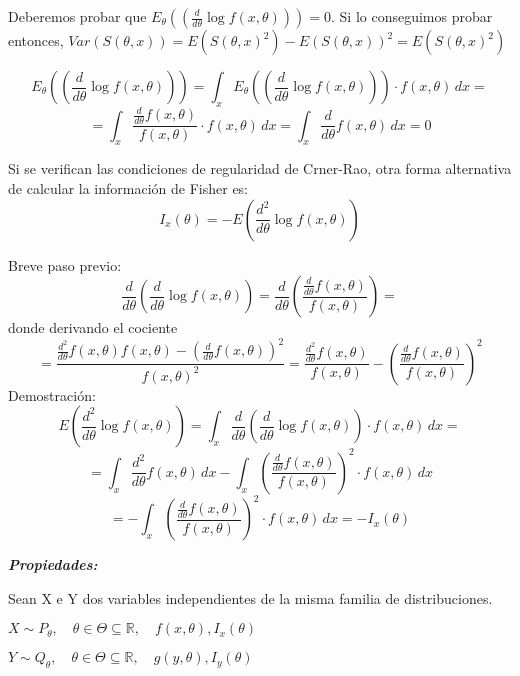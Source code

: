 \newpage

\begin{proofs}
    Deberemos probar que $E_\theta(\left(\frac{d}{d \theta} \log f(x,\theta)\right))=0$.
    Si lo conseguimos probar entonces, $Var(S(\theta,x))=E(S(\theta,x)^2)
    -E(S(\theta,x))^2=E(S(\theta,x)^2)$

    \[
        E_\theta\left(\left(\frac{d}{d \theta} \log f(x,\theta)\right)\right)=
        \int_{x} E_\theta\left(\left(\frac{d}{d \theta} \log f(x,\theta)\right)\right) \cdot f(x,\theta) \,dx =
    \]
    \[
        =\int_{x} \frac{\frac{d}{d \theta} f(x,\theta)}{f(x,\theta)} \cdot f(x,\theta) \,dx 
        =\int_{x} \frac{d}{d \theta} f(x,\theta) \,dx = 0
    \]
\end{proofs}


Si se verifican las condiciones de regularidad de Crner-Rao, otra forma alternativa de calcular
la información de Fisher es:
\[
    I_x(\theta)=-E\left(\frac{d^2}{d \theta} \log f(x,\theta)\right)
\]

\begin{proofs}
    Breve paso previo:
    \[
        \frac{d}{d \theta}\left(\frac{d}{d \theta} \log f(x,\theta)\right)=\frac{d}{d \theta}\left(\frac{\frac{d}{d \theta} f(x,\theta)}{f(x,\theta)}\right)=
    \]
    donde derivando el cociente
    \[
        =\frac{\frac{d^2}{d \theta} f(x,\theta) f(x,\theta) -\left(\frac{d}{d \theta} f(x,\theta)\right)^2}{f(x,\theta)^2}=\frac{\frac{d^2}{d \theta} f(x,\theta)}{f(x,\theta)} -\left(\frac{\frac{d}{d \theta} f(x,\theta)}{f(x,\theta)}\right)^2
    \]
    Demostración:
    \[
        E(\frac{d^2}{d \theta} \log f(x,\theta))=
        \int_{x} \frac{d}{d \theta}\left(\frac{d}{d \theta} \log f(x,\theta)\right) \cdot f(x,\theta) \,dx =
    \]
    \[
        =\int_{x} \frac{d^2}{d \theta} f(x, \theta) \,dx - \int_{x}\left(\frac{\frac{d}{d \theta} f(x,\theta)}{f(x,\theta)}\right)^2 \cdot f(x,\theta) \,dx  
    \]
    \[
        = -\int_{x}(\frac{\frac{d}{d \theta} f(x,\theta)}{f(x,\theta)})^2 \cdot f(x,\theta) \,dx=-I_x(\theta)
    \]
\end{proofs}

\textbf{\textit{Propiedades:}}

Sean X e Y dos variables independientes de la misma familia de distribuciones.

$
X \sim P_\theta, \quad \theta \in \Theta \subseteq \mathbb{R}, \quad f(x,\theta), I_x(\theta)
$

$
Y \sim Q_\theta, \quad \theta \in \Theta \subseteq \mathbb{R}, \quad g(y,\theta), I_y(\theta)
$

